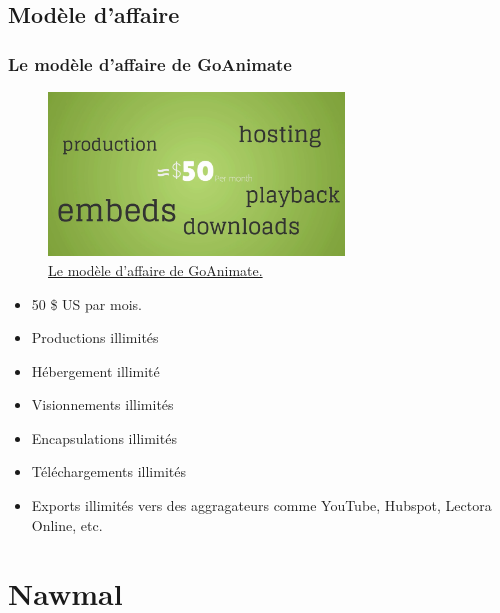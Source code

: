 \subsection{Modèle d'affaire} 
		\begin{frame}[allowframebreaks]
			\frametitle{Le modèle d'affaire de GoAnimate}
			\begin{figure}
			\centering
                     \includegraphics[width = 0.7\textwidth]{modeleaffaire.png}
                     \caption{\tiny{\href{run:modeleaffaire.png}{Le modèle d'affaire de GoAnimate.}}}
                   \end{figure}
			\framebreak
			\begin {itemize}
				\item 50 \$ US par mois.
				\item Productions illimités
				\item Hébergement illimité
				\item Visionnements illimités
				\item Encapsulations illimités
				\item Téléchargements illimités
				\item Exports illimités vers des aggragateurs comme YouTube, Hubspot, Lectora Online, etc.

			\end{itemize}
			
			\end{frame}	
			
\section{Nawmal} 
